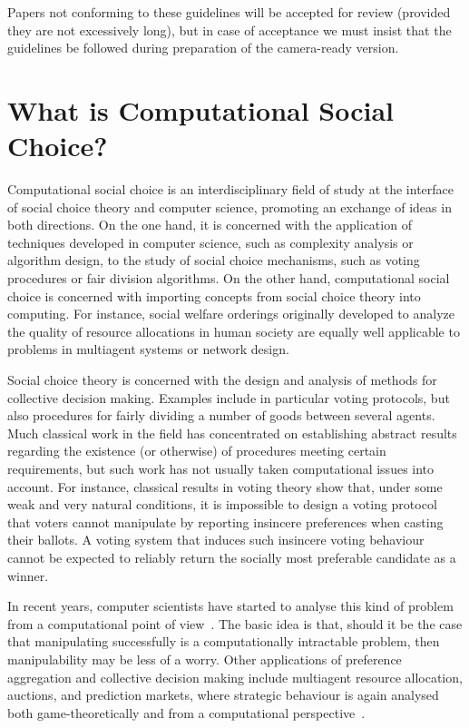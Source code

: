 \documentclass{comsoc2023}[a4paper]
\begin{document}
Papers not conforming to these guidelines will be accepted for review (provided they are not excessively long), but in case of acceptance we must insist that the guidelines be followed during preparation of the camera-ready version. 


\section{What is Computational Social Choice?}

Computational social choice \cite{BCELP16,Rot15,Pro11,CELM07} is an interdisciplinary field of study at the interface of social choice theory and computer science, promoting an exchange of ideas in both directions. On the one hand, it is concerned with the application of techniques developed in computer science, such as complexity analysis or algorithm design, to the study of social choice mechanisms, such as voting procedures or fair division algorithms. On the other hand, computational social choice is concerned with importing concepts from social choice theory into computing. For instance, social welfare orderings originally developed to analyze the quality of resource allocations in human society are equally well applicable to problems in multiagent systems or network design.

Social choice theory is concerned with the design and analysis of methods for collective decision making. Examples include in particular voting protocols, but also procedures for fairly dividing a number of goods between several agents. Much classical work in the field has concentrated on establishing abstract results regarding the existence (or otherwise) of procedures meeting certain requirements, but such work has not usually taken computational issues into account. For instance, classical results in voting theory show that, under some weak and very natural conditions, it is impossible to design a voting protocol that voters cannot manipulate by reporting insincere preferences when casting their ballots. A voting system that induces such insincere voting behaviour cannot be expected to reliably return the socially most preferable candidate as a winner.

In recent years, computer scientists have started to analyse this kind of problem from a computational point of view~\cite{FHHR09,FHH10,FP10}. The basic idea is that, should it be the case that manipulating successfully is a computationally intractable problem, then manipulability may be less of a worry. Other applications of preference aggregation and collective decision making include multiagent resource allocation, auctions, and prediction markets, where strategic behaviour is again analysed both game-theoretically and from a computational perspective~\cite{Mei18}.
\end{document}
